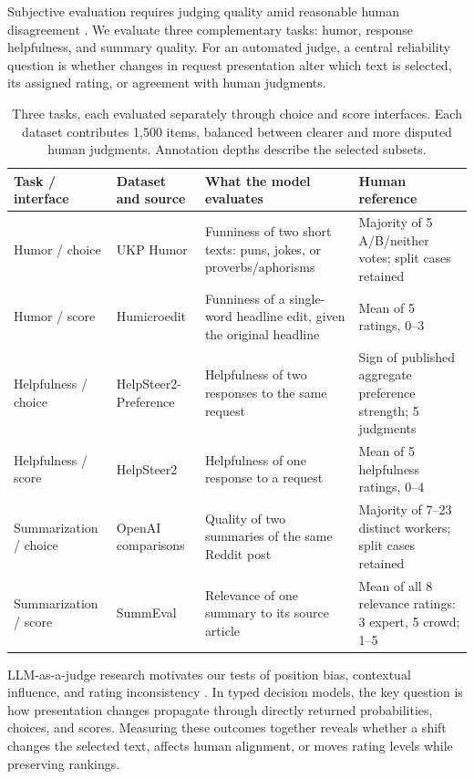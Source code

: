 \documentclass[11pt]{article}
\begin{document}
Subjective evaluation requires judging quality amid reasonable human disagreement \citep{plank-2022-problem}. We evaluate three complementary tasks: humor, response helpfulness, and summary quality. For an automated judge, a central reliability question is whether changes in request presentation alter which text is selected, its assigned rating, or agreement with human judgments.

\begin{table}[t]
\small
\setlength{\tabcolsep}{4pt}
\begin{tabularx}{\textwidth}{@{}>{\raggedright\arraybackslash}p{2.1cm}>{\raggedright\arraybackslash}p{3.05cm}Y Y@{}}
\toprule
Task / interface & Dataset and source & What the model evaluates & Human reference \\
\midrule
Humor / choice & UKP Humor \citep{simpson-etal-2019-predicting} & Funniness of two short texts: puns, jokes, or proverbs/aphorisms & Majority of 5 A/B/neither votes; split cases retained \\
Humor / score & Humicroedit \citep{hossain-etal-2020-semeval} & Funniness of a single-word headline edit, given the original headline & Mean of 5 ratings, 0--3 \\
Helpfulness / choice & HelpSteer2-Preference \citep{ICLR2025_8e237ec6} & Helpfulness of two responses to the same request & Sign of published aggregate preference strength; 5 judgments \\
Helpfulness / score & HelpSteer2 \citep{NEURIPS2024_02fd91a3} & Helpfulness of one response to a request & Mean of 5 helpfulness ratings, 0--4 \\
Summarization / choice & OpenAI comparisons \citep{NEURIPS2020_1f89885d} & Quality of two summaries of the same Reddit post & Majority of 7--23 distinct workers; split cases retained \\
Summarization / score & SummEval \citep{fabbri-etal-2021-summeval} & Relevance of one summary to its source article & Mean of all 8 relevance ratings: 3 expert, 5 crowd; 1--5 \\
\bottomrule
\end{tabularx}
\caption{Three tasks, each evaluated separately through choice and score interfaces. Each dataset contributes 1,500 items, balanced between clearer and more disputed human judgments. Annotation depths describe the selected subsets.}
\label{tab:data}
\end{table}

LLM-as-a-judge research motivates our tests of position bias, contextual influence, and rating inconsistency \citep{gu2024survey,wang-etal-2024-large-language-models-fair,chen-etal-2024-humans,stureborg2024}. In typed decision models, the key question is how presentation changes propagate through directly returned probabilities, choices, and scores. Measuring these outcomes together reveals whether a shift changes the selected text, affects human alignment, or moves rating levels while preserving rankings.
\end{document}
